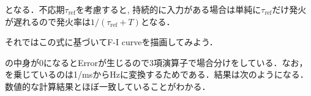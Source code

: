 となる．不応期$\tau_{\text{ref}}$を考慮すると, 持続的に入力がある場合は単純に$\tau_{\text{ref}}$だけ発火が遅れるので発火率は$1/(\tau_{\text{ref}}+T)$となる．

それではこの式に基づいてF-I curveを描画してみよう．

の中身が0になるとErrorが生じるので3項演算子で場合分けをしている．なお，を乗じているのは1/msからHzに変換するためである．結果は次のようになる．数値的な計算結果とほぼ一致していることがわかる．


